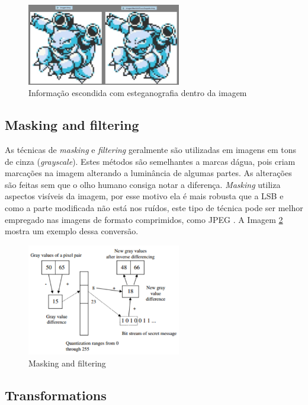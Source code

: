 \documentclass[12pt]{article}
\begin{document}
\begin{figure}[ht]
	\centering
	\includegraphics[width=0.6\textwidth]{imagens.pdf}
	\caption{Informação escondida com esteganografia dentro da imagem}
	\label{comp}
\end{figure} 

\subsection{Masking and filtering}

As técnicas de \textit{masking} e \textit{filtering} geralmente são utilizadas em imagens em tons de cinza (\textit{grayscale}). Estes métodos são semelhantes a marcas d\'agua, pois criam marcações na imagem alterando a luminância de algumas partes. As alterações são feitas sem que o olho humano consiga notar a diferença. \textit{Masking} utiliza aspectos visíveis da imagem, por esse motivo ela é mais robusta que a LSB e como a parte modificada não está nos ruídos, este tipo de técnica pode ser melhor empregado nas imagens de formato comprimidos, como JPEG \cite{methods}. A Imagem \ref{gray}\cite{wu2003} mostra um exemplo dessa conversão.

\begin{figure}[ht]
	\centering
	\includegraphics[width=0.6\textwidth]{mask.pdf}
	\caption{Masking and filtering}
	\label{gray}
\end{figure} 

\subsection{Transformations}
\end{document}
